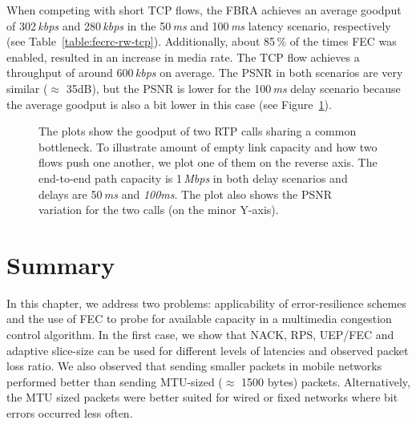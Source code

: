 When competing with short TCP flows, the FBRA achieves an average goodput of
302\,\emph{kbps} and 280\,\emph{kbps} in the 50\,\emph{ms} and 100\,\emph{ms}
latency scenario, respectively (see Table~\ref{table:fecrc-rw-tcp}).
Additionally, about 85\,\% of the times FEC was enabled, resulted in an
increase in media rate. The TCP flow achieves a throughput of around
600\,\emph{kbps} on average. The PSNR in both scenarios are very similar
($\approx$ 35dB), but the PSNR is lower for the 100\,\emph{ms} delay scenario because the
average goodput is also a bit lower in this case (see Figure~\ref{fig:fecrc-dnet}).


\begin{figure}
\caption{The plots show the goodput of two RTP calls sharing a common
bottleneck. To illustrate amount of empty link capacity and how two flows push
one another, we plot one of them on the reverse axis. The end-to-end path
capacity is 1\,\emph{Mbps} in both delay scenarios and delays are 50\,\emph{ms}
and \emph{100ms}. The plot also shows the PSNR variation for the two calls (on
the minor Y-axis).}
\label{fig:fecrc-dnet}
\end{figure}


\section{Summary}

In this chapter, we address two problems: applicability of error-resilience
schemes and the use of FEC to probe for available capacity in a multimedia congestion
control algorithm. In the first case, we show that NACK, RPS, UEP/FEC and adaptive 
slice-size can be used for different levels of latencies and observed packet
loss ratio. We also observed that sending smaller packets in mobile networks
performed better than sending MTU-sized ($\approx$ 1500 bytes) packets.
Alternatively, the MTU sized packets were better suited for wired or fixed
networks where bit errors occurred less often.

